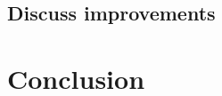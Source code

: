 \documentclass[aps,pra,a4paper,nofootinbib,onecolumn,tightenlines,longbibliography,12pt,amsfonts,amssymb,amsmath,floatfix]{revtex4-2} %
\begin{document}
  \subsection{Discuss improvements} %
  \label{sub:Discuss improvement}



\section{Conclusion} %
\label{sec:Conclusion}






\end{document}

